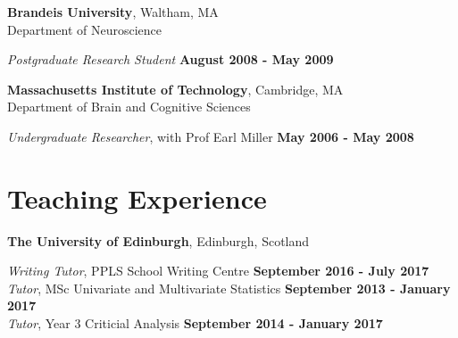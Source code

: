 \documentclass[margin,line]{res}
\begin{document}
\begin{resume}
\vspace{-.1cm}

{\bf Brandeis University}, Waltham, MA \\
Department of Neuroscience

\vspace{-.2cm}
{\em Postgraduate Research Student} \hfill {\bf August 2008 - May 2009}\\
\vspace{-.3cm}


\vspace{-.1cm}

{\bf Massachusetts Institute of Technology}, Cambridge, MA \\
Department of Brain and Cognitive Sciences

\vspace{-.2cm}
{\em Undergraduate Researcher}, with Prof Earl Miller \hfill {\bf May 2006 - May 2008}\\
\vspace{-.3cm}




\section{\sc Teaching Experience}

{\bf  The University of Edinburgh}, Edinburgh, Scotland

\vspace{-.3cm}

\vspace{.1cm}
{\em Writing Tutor}, PPLS School Writing Centre \hfill {\bf September 2016 - July 2017}\\

\vspace{-.4cm}
{\em Tutor}, MSc Univariate and Multivariate Statistics \hfill {\bf September 2013 - January 2017}\\

\vspace{-.4cm}
{\em Tutor}, Year 3 Criticial Analysis \hfill {\bf September 2014 - January 2017}\\


\end{resume}
\end{document}
